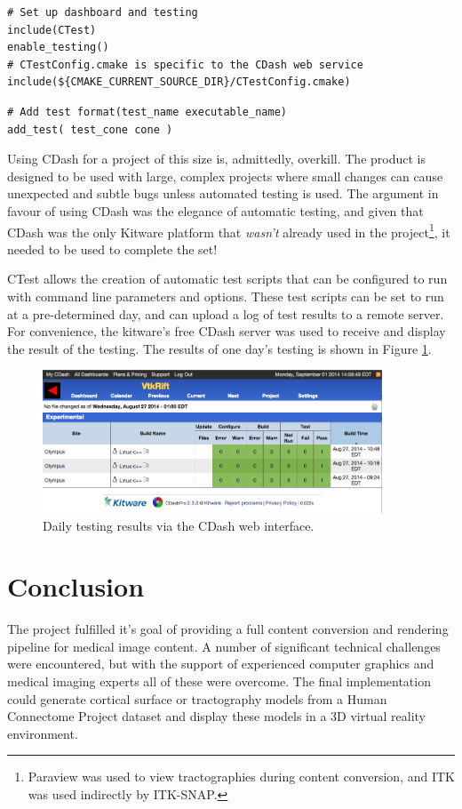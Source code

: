 \documentclass[MSc,paper=a4,pagesize=auto]{icldt}
\begin{document}
\begin{lstlisting}[label=configuring_ctest, caption=Enabling CTest in the CMakeLists]
# Set up dashboard and testing
include(CTest)
enable_testing()
# CTestConfig.cmake is specific to the CDash web service
include(${CMAKE_CURRENT_SOURCE_DIR}/CTestConfig.cmake)
\end{lstlisting}

\begin{lstlisting}[label=setting_a_test, caption=Configuring a specific test]
# Add test format(test_name executable_name)
add_test( test_cone cone )
\end{lstlisting}

Using CDash for a project of this size is, admittedly, overkill. The product is designed to be used with large, complex projects where small changes can cause unexpected and subtle bugs unless automated testing is used. The argument in favour of using CDash was the elegance of automatic testing, and given that CDash was the only Kitware platform that \textit{wasn't} already used in the project\footnote{Paraview was used to view tractographies during content conversion, and ITK was used indirectly by ITK-SNAP.}, it needed to be used to complete the set!

CTest allows the creation of automatic test scripts that can be configured to run with command line parameters and options. These test scripts can be set to run at a pre-determined day, and can upload a log of test results to a remote server. For convenience, the kitware's free CDash server was used to receive and display the result of the testing. The results of one day's testing is shown in Figure \ref{fig:cdash_testing}. 

\begin{figure}[htbp!]
    \centering
    \includegraphics[width=0.9\textwidth]{resources/cdash_testing}
    \caption{Daily testing results via the CDash web interface.}
    \label{fig:cdash_testing}
\end{figure}

\chapter{Conclusion}
The project fulfilled it's goal of providing a full content conversion and rendering pipeline for medical image content. A number of significant technical challenges were encountered, but with the support of experienced computer graphics and medical imaging experts all of these were overcome. The final implementation could generate cortical surface or tractography models from a Human Connectome Project dataset and display these models in a 3D virtual reality environment. 
\end{document}
